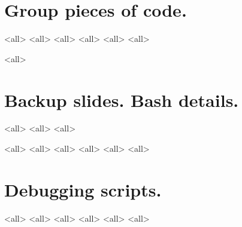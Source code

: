 \section{Group pieces of code.}
\mode<all>{}
\mode<all>{}
\mode<all>{}
\mode<all>{}
\mode<all>{}
\mode<all>{}

\mode<all>{}

\section{Backup slides. Bash details.}
\mode<all>{}
\mode<all>{}
\mode<all>{}

\mode<all>{}
\mode<all>{}
\mode<all>{}
\mode<all>{}
\mode<all>{}
\mode<all>{}

\section{Debugging scripts.}
\mode<all>{}
\mode<all>{}
\mode<all>{}
\mode<all>{}
\mode<all>{}
\mode<all>{}


